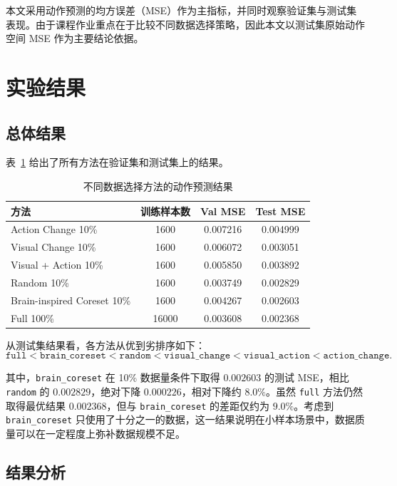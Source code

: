 \documentclass[UTF8,a4paper,12pt]{ctexart}
\begin{document}
本文采用动作预测的均方误差（MSE）作为主指标，并同时观察验证集与测试集表现。由于课程作业重点在于比较不同数据选择策略，因此本文以测试集原始动作空间 MSE 作为主要结论依据。

\section{实验结果}

\subsection{总体结果}

表~\ref{tab:main-results} 给出了所有方法在验证集和测试集上的结果。

\begin{table}[H]
  \centering
  \caption{不同数据选择方法的动作预测结果}
  \label{tab:main-results}
  \begin{tabular}{lccc}
    \toprule
    方法 & 训练样本数 & Val MSE & Test MSE \\
    \midrule
    Action Change 10\% & 1600 & 0.007216 & 0.004999 \\
    Visual Change 10\% & 1600 & 0.006072 & 0.003051 \\
    Visual + Action 10\% & 1600 & 0.005850 & 0.003892 \\
    Random 10\% & 1600 & 0.003749 & 0.002829 \\
    Brain-inspired Coreset 10\% & 1600 & 0.004267 & 0.002603 \\
    Full 100\% & 16000 & 0.003608 & 0.002368 \\
    \bottomrule
  \end{tabular}
\end{table}

从测试集结果看，各方法从优到劣排序如下：
\[
\texttt{full} < \texttt{brain\_coreset} < \texttt{random} < \texttt{visual\_change} < \texttt{visual\_action} < \texttt{action\_change}.
\]

其中，\texttt{brain\_coreset} 在 10\% 数据量条件下取得 $0.002603$ 的测试 MSE，相比 \texttt{random} 的 $0.002829$，绝对下降 $0.000226$，相对下降约 $8.0\%$。虽然 \texttt{full} 方法仍然取得最优结果 $0.002368$，但与 \texttt{brain\_coreset} 的差距仅约为 $9.0\%$。考虑到 \texttt{brain\_coreset} 只使用了十分之一的数据，这一结果说明在小样本场景中，数据质量可以在一定程度上弥补数据规模不足。

\subsection{结果分析}
\end{document}
